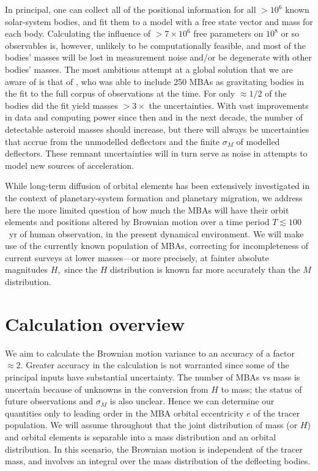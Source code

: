 \documentclass[linenumbers, onecolumn]{aastex631}
\begin{document}
In principal, one can collect all of the positional information for
all $>10^6$ known solar-system bodies, and fit them to a model with
a free state vector and mass for each body.  Calculating the influence
of $>7\times10^6$ free parameters on $10^8$ or so observables is,
however, unlikely to be computationally feasible, and most of the
bodies' masses will be lost in measurement noise and/or be degenerate
with other bodies' masses.  The most ambitious attempt at a global
solution that we are aware of is that of \citet{goffin}, who was able
to include 250 MBAs as gravitating bodies in the fit to the full
corpus of observations at the time.  For only $\approx 1/2$ of the
bodies did the fit yield masses $>3\times$ the uncertainties.  With
vast improvements in data and computing power since then and in the
next decade, the number of detectable
asteroid masses should increase, but there will always be
uncertainties that accrue from the unmodelled deflectors and the
finite $\sigma_M$ of modelled deflectors.  These remnant uncertainties
will in turn serve as noise in attempts to model new sources of
acceleration.

While long-term diffusion of orbital elements has been extensively
investigated in the context of planetary-system formation and
planetary migration, we address here the more limited question of how
much the MBAs will have their orbit elements and positions altered
by Brownian motion over a time period $T \lesssim100$~yr of human
observation, in the present dynamical environment.  We will make use
of the currently known population of MBAs, correcting for
incompleteness of current surveys at lower masses---or more precisely,
at fainter absolute magnitudes $H,$ since the $H$ distribution is
known far more accurately than the $M$ distribution.


\section{Calculation overview}
We aim to calculate the Brownian motion variance to an accuracy of a
factor $\approx 2.$
Greater accuracy in the calculation is not warranted
since some of the principal inputs have substantial uncertainty.  The
number of MBAs vs mass is 
uncertain because of unknowns in the conversion
from $H$ to mass; the status of future observations and $\sigma_M$ is
also unclear.  Hence we can determine our quantities only to leading
order in the MBA orbital eccentricity $e$ of the tracer population.
We will assume throughout that the joint
distribution of mass (or $H$) and orbital elements is separable into a
mass distribution and an orbital distribution.  In this scenario, the
Brownian motion is independent of the tracer mass, and involves an
integral over the mass distribution of the deflecting bodies.
\end{document}
